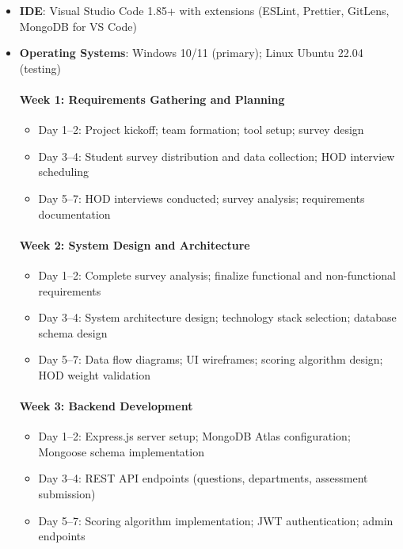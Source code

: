 \documentclass[12pt, a4paper]{article}
\begin{document}
\begin{itemize}[leftmargin=1.5em, itemsep=3pt]
    \item \textbf{IDE}: Visual Studio Code 1.85+ with extensions (ESLint, Prettier, GitLens, MongoDB for VS Code)
    \item \textbf{Operating Systems}: Windows 10/11 (primary); Linux Ubuntu 22.04 (testing)
\paragraph{Week 1: Requirements Gathering and Planning}

\begin{itemize}[leftmargin=1.5em, itemsep=2pt]
    \item Day 1--2: Project kickoff; team formation; tool setup; survey design
    \item Day 3--4: Student survey distribution and data collection; HOD interview scheduling
    \item Day 5--7: HOD interviews conducted; survey analysis; requirements documentation
\end{itemize}

\paragraph{Week 2: System Design and Architecture}

\begin{itemize}[leftmargin=1.5em, itemsep=2pt]
    \item Day 1--2: Complete survey analysis; finalize functional and non-functional requirements
    \item Day 3--4: System architecture design; technology stack selection; database schema design
    \item Day 5--7: Data flow diagrams; UI wireframes; scoring algorithm design; HOD weight validation
\end{itemize}

\paragraph{Week 3: Backend Development}

\begin{itemize}[leftmargin=1.5em, itemsep=2pt]
    \item Day 1--2: Express.js server setup; MongoDB Atlas configuration; Mongoose schema implementation
    \item Day 3--4: REST API endpoints (questions, departments, assessment submission)
    \item Day 5--7: Scoring algorithm implementation; JWT authentication; admin endpoints
\end{itemize}


\end{itemize}
\end{document}
